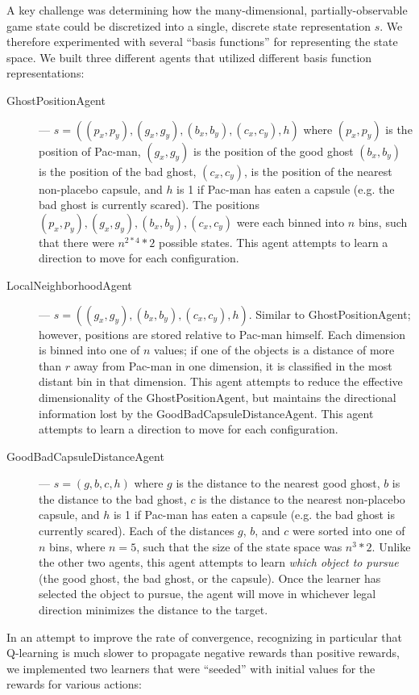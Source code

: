 \documentclass[11pt]{amsart}
\begin{document}
A key challenge was determining how the many-dimensional, partially-observable game state could be discretized into a single, discrete state representation $s$. We therefore experimented with several ``basis functions'' for representing the state space. We built three different agents that utilized different basis function representations:

\begin{description}
	\item[GhostPositionAgent] --- $s = ((p_x, p_y), (g_x, g_y), (b_x, b_y), (c_x, c_y), h)$ where $(p_x, p_y)$ is the position of Pac-man, $(g_x, g_y)$ is the position of the good ghost $(b_x, b_y)$ is the position of the bad ghost, $(c_x, c_y)$, is the position of the nearest non-placebo capsule, and $h$ is 1 if Pac-man has eaten a capsule (e.g. the bad ghost is currently scared). The positions $(p_x, p_y), (g_x, g_y), (b_x, b_y), (c_x, c_y)$ were each binned into $n$ bins, such that there were $n^{2 * 4} * 2$ possible states. This agent attempts to learn a direction to move for each configuration.
	\item[LocalNeighborhoodAgent] --- $s = ((g_x, g_y), (b_x, b_y), (c_x, c_y), h)$. Similar to GhostPositionAgent; however, positions are stored relative to Pac-man himself. Each dimension is binned into one of $n$ values; if one of the objects is a distance of more than $r$ away from Pac-man in one dimension, it is classified in the most distant bin in that dimension. This agent attempts to reduce the effective dimensionality of the GhostPositionAgent, but maintains the directional information lost by the GoodBadCapsuleDistanceAgent. This agent attempts to learn a direction to move for each configuration.
	\item[GoodBadCapsuleDistanceAgent] --- $s = (g, b, c, h)$ where $g$ is the distance to the nearest good ghost, $b$ is the distance to the bad ghost, $c$ is the distance to the nearest non-placebo capsule, and $h$ is 1 if Pac-man has eaten a capsule (e.g. the bad ghost is currently scared). Each of the distances $g$, $b$, and $c$ were sorted into one of $n$ bins, where $n = 5$, such that the size of the state space was $n^3 * 2$. Unlike the other two agents, this agent attempts to learn \emph{which object to pursue} (the good ghost, the bad ghost, or the capsule). Once the learner has selected the object to pursue, the agent will move in whichever legal direction minimizes the distance to the target.  
\end{description}

In an attempt to improve the rate of convergence, recognizing in particular that Q-learning is much slower to propagate negative rewards than positive rewards, we implemented two learners that were ``seeded'' with initial values for the rewards for various actions:
\end{document}

